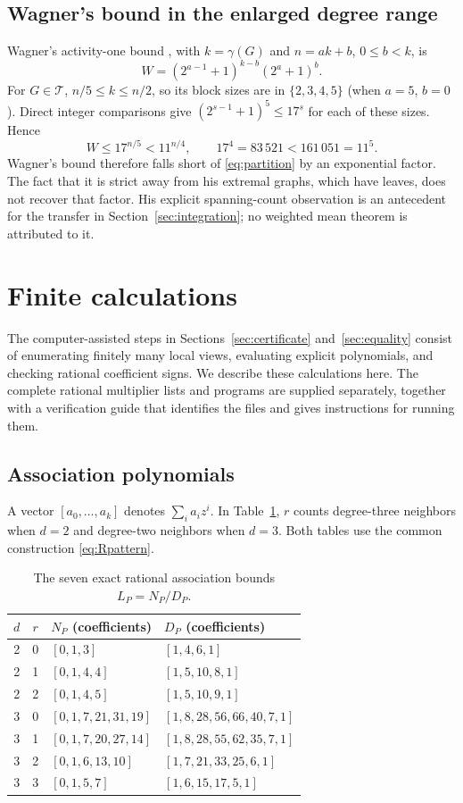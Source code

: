 \documentclass[11pt]{article}
\begin{document}
\subsection{Wagner's bound in the enlarged degree range}
Wagner's activity-one bound \cite[Theorem 4 and proof]{Wagner2013}, with $k=\gamma(G)$ and $n=ak+b$, $0\le b<k$, is
\[
 W=(2^{a-1}+1)^{k-b}(2^a+1)^b.
\]
For $G\in\mathcal T$, $n/5\le k\le n/2$, so its block sizes are in $\{2,3,4,5\}$ (when $a=5$, $b=0$). Direct integer comparisons give $(2^{s-1}+1)^5\le17^s$ for each of these sizes. Hence
\[
 W\le17^{n/5}<11^{n/4},\qquad17^4=83\,521<161\,051=11^5.
\]
Wagner's bound therefore falls short of \eqref{eq:partition} by an exponential factor. The fact that it is strict away from his extremal graphs, which have leaves, does not recover that factor. His explicit spanning-count observation is an antecedent for the transfer in Section~\ref{sec:integration}; no weighted mean theorem is attributed to it.

\section{Finite calculations}\label{app:replay}
The computer-assisted steps in Sections~\ref{sec:certificate} and~\ref{sec:equality} consist of enumerating finitely many local views, evaluating explicit polynomials, and checking rational coefficient signs. We describe these calculations here. The complete rational multiplier lists and programs are supplied separately, together with a verification guide that identifies the files and gives instructions for running them.

\subsection{Association polynomials}

A vector $[a_0,\ldots,a_k]$ denotes $\sum_i a_i z^i$. In Table~\ref{tab:patterns}, $r$ counts degree-three neighbors when $d=2$ and degree-two neighbors when $d=3$. Both tables use the common construction \eqref{eq:Rpattern}.

\begin{table}[ht]
\centering\small
\begin{tabular}{ccll}\toprule
$d$&$r$&$N_P$ (coefficients)&$D_P$ (coefficients)\\\midrule
2&0&$[0,1,3]$&$[1,4,6,1]$\\
2&1&$[0,1,4,4]$&$[1,5,10,8,1]$\\
2&2&$[0,1,4,5]$&$[1,5,10,9,1]$\\
3&0&$[0,1,7,21,31,19]$&$[1,8,28,56,66,40,7,1]$\\
3&1&$[0,1,7,20,27,14]$&$[1,8,28,55,62,35,7,1]$\\
3&2&$[0,1,6,13,10]$&$[1,7,21,33,25,6,1]$\\
3&3&$[0,1,5,7]$&$[1,6,15,17,5,1]$\\\bottomrule
\end{tabular}
\caption{The seven exact rational association bounds $L_P=N_P/D_P$.}\label{tab:patterns}
\end{table}
\end{document}
